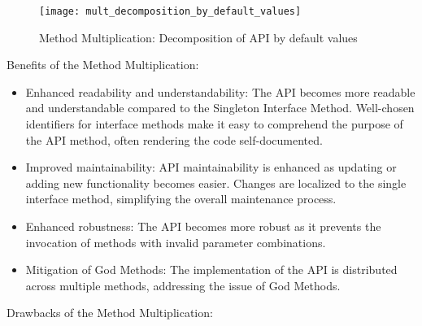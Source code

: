 \begin{figure}[!htb]
    \centering
    \texttt{[image: mult\_decomposition\_by\_default\_values]}
    \caption{Method Multiplication: Decomposition of API by default values}
    \label{fig:mult_decomposition_by_default_values}
\end{figure}

Benefits of the Method Multiplication:

\begin{itemize}
    \item Enhanced readability and understandability:
    The API becomes more readable and understandable compared to the Singleton Interface Method.
    Well-chosen identifiers for interface methods make it easy to comprehend the purpose of the API method,
    often rendering the code self-documented.
    \item Improved maintainability:
    API maintainability is enhanced as updating or adding new functionality becomes easier.
    Changes are localized to the single interface method, simplifying the overall maintenance process.
    \item Enhanced robustness:
    The API becomes more robust as it prevents the invocation of methods with invalid parameter combinations.
    \item Mitigation of God Methods:
    The implementation of the API is distributed across multiple methods, addressing the issue of God Methods.
\end{itemize}

Drawbacks of the Method Multiplication:

